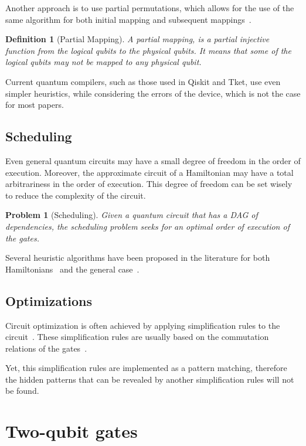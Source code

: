 \documentclass{report}
\newtheorem{definition}{Definition}
\newtheorem{problem}{Problem}
\begin{document}
Another approach is to use partial permutations, which allows for the use of the same algorithm for both initial mapping and subsequent mappings~\cite{childs, zulehner2018}.

\begin{definition}[Partial Mapping]
  A partial mapping, is a partial injective function from the logical qubits to the physical qubits.
  It means that some of the logical qubits may not be mapped to any physical qubit.
\end{definition}

Current quantum compilers, such as those used in Qiskit\cite{qiskit2023, cross2022, murali2019} and Tket\cite{sivarajah2021}, use even simpler heuristics, while considering the errors of the device, which is not the case for most papers.

\subsection{Scheduling}

Even general quantum circuits may have a small degree of freedom in the order of execution. Moreover, the approximate circuit of a Hamiltonian may have a total arbitrariness in the order of execution. This degree of freedom can be set wisely to reduce the complexity of the circuit.

\begin{problem}[Scheduling]
  Given a quantum circuit that has a DAG of dependencies, the scheduling problem seeks for an optimal order of execution of the gates.
\end{problem}

Several heuristic algorithms have been proposed in the literature for both Hamiltonians~\cite{lao2021} and the general case~\cite{zhou2020, zulehner2018}.

\subsection{Optimizations}

Circuit optimization is often achieved by applying simplification rules to the circuit~\cite{pointing2021}. These simplification rules are usually based on the commutation relations of the gates~\cite{itoko2019}.

Yet, this simplification rules are implemented as a pattern matching, therefore the hidden patterns that can be revealed by another simplification rules will not be found.

\section{Two-qubit gates}
\end{document}
